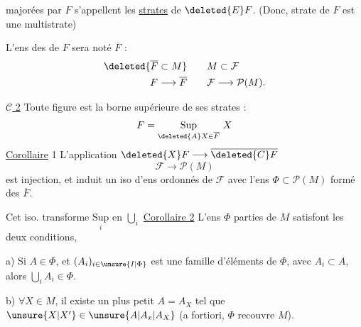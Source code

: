 
majorées par $F$ s'appellent les \uline{strates} de $\deleted{E}F$. (Donc,  strate de $F$ est une multistrate)

L'ens des  de $F$  sera noté $\overline F$ : \[ \begin{aligned} \deleted{\overline F\subset M} &\qquad  M\subset\mathcal F\\ F\longrightarrow\overline F &\qquad \mathcal F\longrightarrow\mathcal P( M). \end{aligned} \]

\uline{$\mathcal C$ 2} Toute figure est la borne supérieure de ses strates : \[ F=\underset{\deleted{A}X\in\overline F}{\mathrm{Sup}}\ X \]
\uline{Corollaire} 1 L'application $\deleted{X}F\longrightarrow\overline{\deleted{C}F}$ \[ \mathcal F\longrightarrow\mathcal P( M) \] est injection, et induit un iso d'ens ordonnés de $\mathcal F$ avec l'ens $\Phi\subset\mathcal P( M)$ formé des $\overline F$.

Cet iso. transforme $\underset{i}{\mathrm{Sup}}$ en $\bigcup_i$
\uline{Corollaire 2} L'ens $\Phi$  parties de $ M$ satisfont les deux conditions,


 a) Si $A\in\Phi$, et $(A_i)_{i\in\unsure{I|\Phi}}$ est une famille d'éléments de $\Phi$, avec $A_i\subset A$, alors $\bigcup_iA_i\in\Phi$.

b) $\forall X\in M$, il existe un plus petit $A=A_X$ tel que $\unsure{X|X'}\in\unsure{A|A_x|A_X}$ (a fortiori, $\Phi$ recouvre $ M$).

